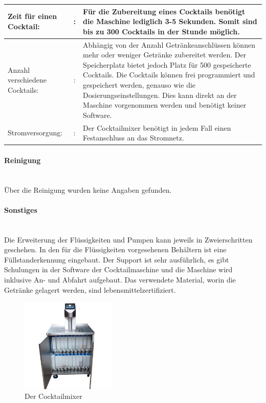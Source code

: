\begin{tabular}{@{}llp{}}
    Zeit für einen Cocktail: & : & Für die Zubereitung eines Cocktails benötigt die Maschine lediglich   3-5 Sekunden. Somit sind bis zu 300 Cocktails in der Stunde möglich. \cite{bg_innovation_cocktailmaschine_nodate}\\
    \hline
    Anzahl verschiedene Cocktails: & : & Abhängig von der Anzahl Getränkeanschlüssen können mehr oder weniger Getränke zubereitet werden. Der Speicherplatz bietet jedoch Platz für 500 gespeicherte Cocktails. Die Cocktails können frei programmiert und gespeichert werden, genauso wie die Dosierungseinstellungen. Dies kann direkt an der Maschine vorgenommen werden und benötigt keiner Software. \cite{bg_innovation_cocktailmaschine_nodate}\\ 
    \hline
    Stromversorgung: & : & Der Cocktailmixer benötigt in jedem Fall einen Festanschluss an das Stromnetz. \cite{bg_innovation_cocktailmaschine_nodate}\\
\end{tabular}

\paragraph{Reinigung}\label{subsubsec:Reinigung_Der_Cocktailmixer}\mbox{}\\

Über die Reinigung wurden keine Angaben gefunden.

\paragraph{Sonstiges}\label{subsubsec:Sonstiges_Der_Cocktailmixer}\mbox{}\\

Die Erweiterung der Flüssigkeiten und Pumpen kann jeweils in Zweierschritten geschehen. In den für die Flüssigkeiten vorgesehenen Behältern ist eine Füllstanderkennung eingebaut. Der Support ist sehr ausführlich, es gibt Schulungen in der Software der Cocktailmaschine und die Maschine wird inklusive An- und Abfahrt aufgebaut. Das verwendete Material, worin die Getränke gelagert werden, sind lebensmittelzertifiziert.\cite{bg_innovation_cocktailmaschine_nodate}

\begin{figure}[h]
	\centering
	\includegraphics[width=0.4\textwidth]{graphics/DerCocktailmixer.png}
	\caption{Der Cocktailmixer \cite{bg_innovation_cocktailmaschine_nodate}}
	\label{fig:DerCocktailmixer_Cocktailmaschine}
\end{figure}